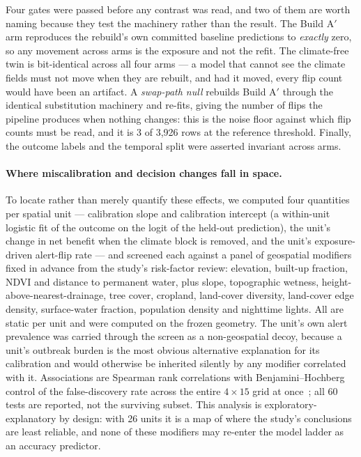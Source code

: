 Four gates were passed before any contrast was read, and two of them are worth naming because they test the machinery rather than the result. The Build A$'$ arm reproduces the rebuild's own committed baseline predictions to \emph{exactly} zero, so any movement across arms is the exposure and not the refit. The climate-free twin is bit-identical across all four arms --- a model that cannot see the climate fields must not move when they are rebuilt, and had it moved, every flip count would have been an artifact. A \emph{swap-path null} rebuilds Build A$'$ through the identical substitution machinery and re-fits, giving the number of flips the pipeline produces when nothing changes: this is the noise floor against which flip counts must be read, and it is 3 of 3{,}926 rows at the reference threshold. Finally, the outcome labels and the temporal split were asserted invariant across arms.

\paragraph{Where miscalibration and decision changes fall in space.} To locate rather than merely quantify these effects, we computed four quantities per spatial unit --- calibration slope and calibration intercept (a within-unit logistic fit of the outcome on the logit of the held-out prediction), the unit's change in net benefit when the climate block is removed, and the unit's exposure-driven alert-flip rate --- and screened each against a panel of geospatial modifiers fixed in advance from the study's risk-factor review: elevation, built-up fraction, NDVI and distance to permanent water, plus slope, topographic wetness, height-above-nearest-drainage, tree cover, cropland, land-cover diversity, land-cover edge density, surface-water fraction, population density and nighttime lights. All are static per unit and were computed on the frozen geometry. The unit's own alert prevalence was carried through the screen as a non-geospatial decoy, because a unit's outbreak burden is the most obvious alternative explanation for its calibration and would otherwise be inherited silently by any modifier correlated with it. Associations are Spearman rank correlations with Benjamini--Hochberg control of the false-discovery rate across the entire $4\times15$ grid at once~\cite{BenjaminiHochberg1995}; all 60 tests are reported, not the surviving subset. This analysis is exploratory-explanatory by design: with 26 units it is a map of where the study's conclusions are least reliable, and none of these modifiers may re-enter the model ladder as an accuracy predictor.

